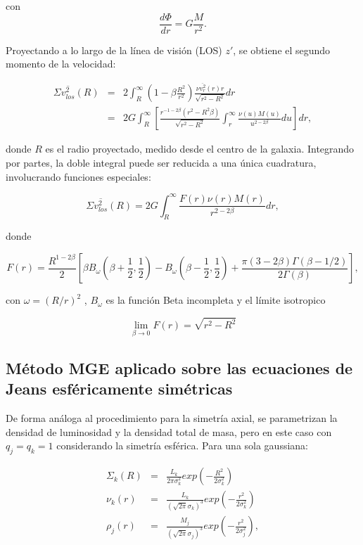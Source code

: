 con $$ \frac{d\Phi}{dr} = G \frac{M}{r^2}. $$

Proyectando a lo largo de la línea de visión (LOS) $z'$, se obtiene el segundo momento de la velocidad:

\begin{eqnarray}
\Sigma \overline{v_{los}^2} (R) &=& 2 \int_R^{\infty} \left (  1-\beta \frac{R^2}{r^2}  \right ) \frac{\nu \overline{ v_r^2 }(r) r }{ \sqrt{r^2 - R^2} } dr \\
 &=& 2G \int_R^{\infty} \left [  \frac{r^{-1-2\beta}(r^2-R^2\beta) }{\sqrt{r^2 - R^2} }  \int_r^{\infty} \frac{\nu(u) M(u) }{ u^{2-2\beta} } du \right ] dr,
\end{eqnarray}

donde $R$ es el radio proyectado, medido desde el centro de la galaxia. Integrando por partes, la doble integral puede ser reducida a una única cuadratura, involucrando funciones especiales:

\begin{equation}
\label{sigma_los_spherical}
\Sigma \overline{v_{los}^2} (R) = 2G \int_R^{\infty} \frac{ F(r) \nu(r) M(r) }{ r^{2-2\beta} } dr,
\end{equation}

donde

\begin{equation}
\label{F_r}
F(r) = \frac{R^{1-2\beta}}{2} \left [ \beta B_{\omega} \left( \beta + \frac{1}{2}, \frac{1}{2} \right)-B_{\omega} \left( \beta - \frac{1}{2}, \frac{1}{2} \right) +\frac{ \pi(3-2\beta) \Gamma (\beta - 1/2) }{ 2\Gamma (\beta) }  \right ],
\end{equation}

con $\omega = (R/r)^2$ , $B_{\omega} $ es la función Beta incompleta y el límite isotropico

$$ \lim_{\beta\to 0} F(r) = \sqrt{r^2 - R^2} $$

\subsection{Método MGE aplicado sobre las ecuaciones de Jeans esféricamente simétricas}

De forma análoga al procedimiento para la simetría axial, se parametrizan la densidad de luminosidad y la densidad total de masa, pero en este caso con $q_j = q_k = 1$ considerando la simetría esférica.
Para una sola gaussiana:

\begin{eqnarray}
\Sigma_k (R) &=& \frac{ L_k }{ 2\pi \sigma_k^2 } exp \left( -\frac{R^2}{2\sigma_k^2} \right)\\
\label{luminosity_density_spherical}
\nu_k (r) &=& \frac{ L_k }{ (\sqrt{2\pi} \sigma_k)^3 } exp \left( -\frac{r^2}{2\sigma_k^2} \right)\\
\rho_j (r) &=& \frac{ M_j }{ (\sqrt{2\pi} \sigma_j)^3 } exp \left( -\frac{r^2}{2\sigma_j^2} \right),\\
\end{eqnarray}

